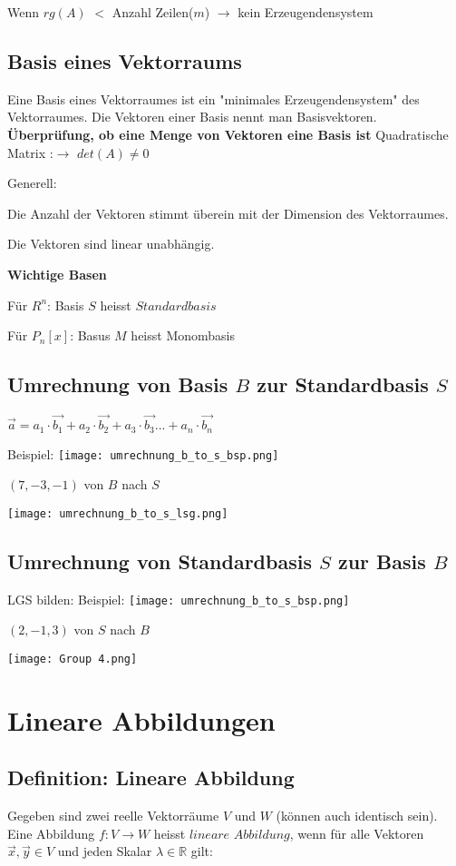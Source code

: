 \begin{multicols*}{3}
    {Wenn $rg(A)$ $<$ Anzahl Zeilen($m$) $\rightarrow$ kein Erzeugendensystem}


    \subsection{Basis eines Vektorraums}
    {Eine Basis eines Vektorraumes ist ein "minimales Erzeugendensystem" des Vektorraumes. Die Vektoren einer Basis nennt man Basisvektoren.}
    {\textbf{Überprüfung, ob eine Menge von Vektoren eine Basis ist}}
    {Quadratische Matrix :$\rightarrow$ $det(A) \neq 0$}

    {Generell:}

    { Die Anzahl der Vektoren stimmt überein mit der Dimension des Vektorraumes.}

    { Die Vektoren sind linear unabhängig.}

    {\textbf{Wichtige Basen}}

    {Für $R^n$: Basis $S$ heisst $Standardbasis$ }

    {Für $P_n[x]$: Basus $M$ heisst Monombasis}
    \WhiteSpace
    \subsection{Umrechnung von Basis $B$ zur Standardbasis $S$}
    {$\vec{a} = a_1 \cdot \vec{b_1} + a_2 \cdot \vec{b_2} + a_3 \cdot \vec{b_3} ... + a_n \cdot \vec{b_n}$}

    {Beispiel:}
    {\texttt{[image: umrechnung\_b\_to\_s\_bsp.png]}}

    {$(7,-3,-1)$ von $B$ nach $S$}

    {\texttt{[image: umrechnung\_b\_to\_s\_lsg.png]}}
    \subsection{Umrechnung von Standardbasis $S$ zur Basis $B$}
    {LGS bilden:}
    {Beispiel:}
    {\texttt{[image: umrechnung\_b\_to\_s\_bsp.png]}}

    {$(2,-1,3)$ von $S$ nach $B$}

    {\texttt{[image: Group 4.png]}}
    \vfill\null
    \columnbreak
    \section{Lineare Abbildungen}
    \subsection{Definition: Lineare Abbildung}
    { Gegeben sind zwei reelle Vektorräume $V$ und $W$ (können auch identisch sein).}
    {Eine Abbildung $f:V \rightarrow W$ heisst $lineare$ $Abbildung$, wenn für alle Vektoren $\vec{x},\vec{y} \in  V$ und jeden Skalar $\lambda \in \mathbb{R} $ gilt:}


\end{multicols*}
